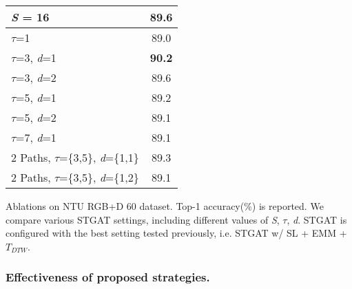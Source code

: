 \documentclass[runningheads]{llncs}
\begin{document}
\begin{minipage}{\textwidth}
\begin{minipage}[t]{0.46\textwidth}
\begin{tabular}[t]{l|c}
          \textit{S} = 16 & 89.6\\  
\hline
          $\tau$=1      &   89.0  \\
          $\tau$=3, \textit{d}=1 & \textbf{90.2}\\ 
          $\tau$=3, \textit{d}=2 & 89.6   \\ 
          $\tau$=5, \textit{d}=1 & 89.2\\ 
          $\tau$=5, \textit{d}=2 & 89.1\\
          $\tau$=7, \textit{d}=1 & 89.1\\
          2 Paths, $\tau$=\{3,5\}, \textit{d}=\{1,1\} & 89.3\\
          2 Paths, $\tau$=\{3,5\}, \textit{d}=\{1,2\} & 89.1\\
          \hline    
          \end{tabular}
\caption{Ablations on NTU RGB+D 60 dataset. Top-1 accuracy(\%) is reported. We compare various STGAT settings, including different values of \textit{S}, $\tau$, \textit{d}. STGAT is configured with the best setting tested previously, i.e. STGAT w/ SL + EMM + $T_{DTW}$. }
          \label{table2} 
    \end{minipage}
    \end{minipage}  
\subsubsection{Effectiveness of proposed strategies.}
\end{document}
